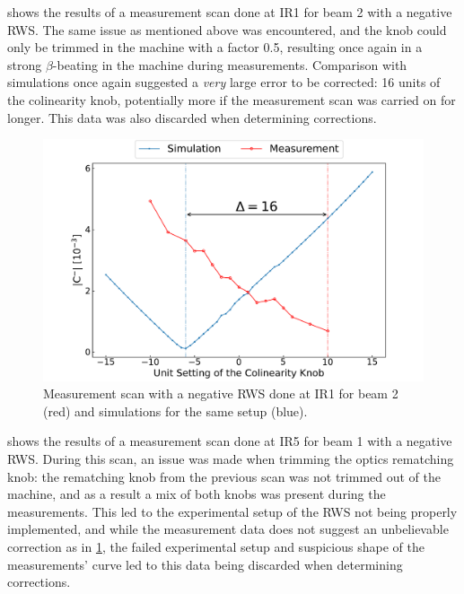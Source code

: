  shows the results of a measurement scan done at IR\num{1} for beam \num{2} with a negative RWS.
The same issue as mentioned above was encountered, and the knob could only be trimmed in the machine with a factor \num{0.5}, resulting once again in a strong \(\beta\)-beating in the machine during measurements.
Comparison with simulations once again suggested a \textit{very} large error to be corrected: \num{16} units of the colinearity knob, potentially more if the measurement scan was carried on for longer.
This data was also discarded when determining corrections.

\begin{figure}[!htb]
    \centering
    \includegraphics*[width=\textwidth]{Figures/Appendices/rws_measurement_ir1_b2_neg.pdf}
    \caption{Measurement scan with a negative RWS done at IR\num{1} for beam \num{2} (\textcolor{mplr}{red}) and simulations for the same setup (\textcolor{mplblue}{blue}).}
    \label{figure:ir1_b2_neg_measurement}
\end{figure}

 shows the results of a measurement scan done at IR\num{5} for beam \num{1} with a negative RWS.
During this scan, an issue was made when trimming the optics rematching knob: the rematching knob from the previous scan was not trimmed out of the machine, and as a result a mix of both knobs was present during the measurements.
This led to the experimental setup of the RWS not being properly implemented, and while the measurement data does not suggest an unbelievable correction as in \cref{figure:ir1_b2_neg_measurement}, the failed experimental setup and suspicious shape of the measurements'  curve led to this data being discarded when determining corrections.

